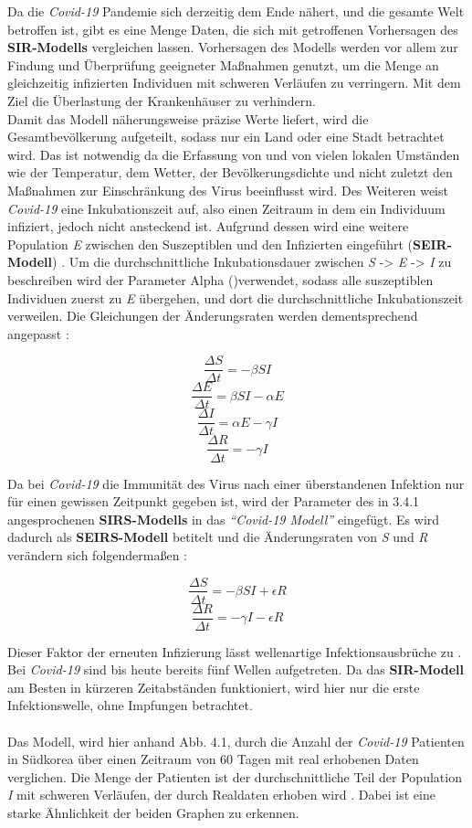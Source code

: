 \documentclass[12pt]{scrartcl} %
\begin{document}
Da die \textsl{Covid-19} Pandemie sich derzeitig dem Ende nähert, und die gesamte Welt betroffen ist, gibt es eine Menge Daten, die sich mit getroffenen Vorhersagen des \textbf{SIR-Modells} vergleichen lassen.
Vorhersagen des Modells werden vor allem zur Findung und Überprüfung geeigneter Maßnahmen genutzt, um die Menge an gleichzeitig infizierten Individuen mit schweren Verläufen zu verringern. Mit dem Ziel die Überlastung der Krankenhäuser zu verhindern.\\
Damit das Modell näherungsweise präzise Werte liefert, wird die Gesamtbevölkerung aufgeteilt, sodass nur ein Land oder eine Stadt betrachtet wird. Das ist notwendig da die Erfassung von \textbeta\space und \textgamma\space von vielen lokalen Umständen wie der Temperatur, dem Wetter, der Bevölkerungsdichte und nicht zuletzt den Maßnahmen zur Einschränkung des Virus beeinflusst wird. 
Des Weiteren weist \textsl{Covid-19} eine Inkubationszeit auf, also einen Zeitraum in dem ein Individuum infiziert, jedoch nicht ansteckend ist. Aufgrund dessen wird eine weitere Population \textit{E} zwischen den Suszeptiblen und den Infizierten eingeführt (\textbf{SEIR-Modell}) \cite{11, 3}. Um die durchschnittliche Inkubationsdauer zwischen \textit{S} -> \textit{E} -> \textit{I} zu beschreiben wird der Parameter Alpha (\textalpha)\space verwendet, sodass alle suszeptiblen Individuen zuerst zu \textit{E} übergehen, und dort die durchschnittliche Inkubationszeit verweilen. Die Gleichungen der Änderungsraten werden dementsprechend angepasst \cite{2, 3}:

$$ \frac{\Delta S}{\Delta t} = -\beta S I $$
$$ \frac{\Delta E}{\Delta t} = \beta S I - \alpha E$$
$$ \frac{\Delta I}{\Delta t} = \alpha E - \gamma I $$
$$ \frac{\Delta R}{\Delta t} = -\gamma I $$

Da bei \textsl{Covid-19} die Immunität des Virus nach einer überstandenen Infektion nur für einen gewissen Zeitpunkt gegeben ist, wird der Parameter \textepsilon\space des in 3.4.1 angesprochenen \textbf{SIRS-Modells} in das \textsl{"`Covid-19 Modell"'} eingefügt. Es wird dadurch als \textbf{SEIRS-Modell} betitelt und die Änderungsraten von \textsl{S} und \textit{R} verändern sich folgendermaßen \cite{8}:

$$ \frac{\Delta S}{\Delta t} = -\beta S I + \epsilon R$$
$$ \frac{\Delta R}{\Delta t} = -\gamma I - \epsilon R$$

Dieser Faktor der erneuten Infizierung lässt wellenartige Infektionsausbrüche zu \cite{3}. Bei \textsl{Covid-19} sind bis heute bereits fünf Wellen aufgetreten. Da das \textbf{SIR-Modell} am Besten in kürzeren Zeitabständen funktioniert, wird hier nur die erste Infektionswelle, ohne Impfungen betrachtet.\\
\\
Das Modell, wird hier anhand Abb. 4.1, durch die Anzahl der \textsl{Covid-19} Patienten in Südkorea über einen Zeitraum von 60 Tagen mit real erhobenen Daten verglichen.
Die Menge der Patienten ist der durchschnittliche Teil der Population \textit{I} mit schweren Verläufen, der durch Realdaten erhoben wird \cite{3}. Dabei ist eine starke Ähnlichkeit der beiden Graphen zu erkennen.
\end{document}
